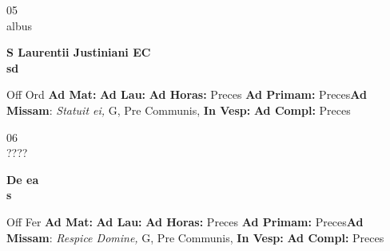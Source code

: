\documentclass[10pt, openany]{book}
\begin{document}
    \begin{center}
        \begin{minipage}{3.5in}
            \vspace{2em}
            \begin{minipage}{0.5in}
                {\Huge 05} \\
                {\normalsize albus}
            \end{minipage}
            \begin{minipage}{3.0in}
                \textbf{ \large S Laurentii Justiniani EC \\
                \textnormal{\normalsize sd}}

            \end{minipage}
            \begin{justify}Off Ord
                \textbf{Ad Mat: }
                \textbf{Ad Lau: }
                \textbf{Ad Horas: }Preces
                \textbf{Ad Primam: }Preces\textbf{Ad Missam}: \textit{Statuit ei,} G, Pre Communis, 
                \textbf{In Vesp: }
                \textbf{Ad Compl: }Preces
            \end{justify}
        \end{minipage}
    \end{center}

    \begin{center}
        \begin{minipage}{3.5in}
            \vspace{2em}
            \begin{minipage}{0.5in}
                {\Huge 06} \\
                {\normalsize ????}
            \end{minipage}
            \begin{minipage}{3.0in}
                \textbf{ \large De ea \\
                \textnormal{\normalsize s}}

            \end{minipage}
            \begin{justify}Off Fer
                \textbf{Ad Mat: }
                \textbf{Ad Lau: }
                \textbf{Ad Horas: }Preces
                \textbf{Ad Primam: }Preces\textbf{Ad Missam}: \textit{Respice Domine,} G, Pre Communis, 
                \textbf{In Vesp: }
                \textbf{Ad Compl: }Preces
            \end{justify}
        \end{minipage}
    \end{center}
\end{document}
